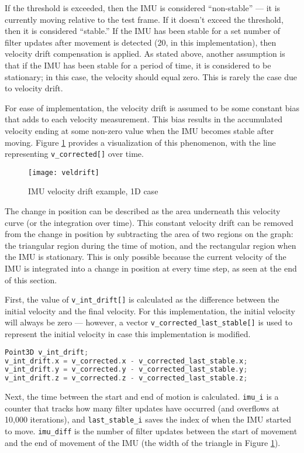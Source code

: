 \documentclass[11pt]{ucthesisCP}
\begin{document}
If the threshold is exceeded, then the IMU is considered “non-stable” --- it is currently moving relative to the test frame. If it doesn’t exceed the threshold, then it is considered “stable.” If the IMU has been stable for a set number of filter updates after movement is detected (20, in this implementation), then velocity drift compensation is applied. As stated above, another assumption is that if the IMU has been stable for a period of time, it is considered to be stationary; in this case, the velocity should equal zero. This is rarely the case due to velocity drift.

For ease of implementation, the velocity drift is assumed to be some constant bias that adds to each velocity measurement. This bias results in the accumulated velocity ending at some non-zero value when the IMU becomes stable after moving. Figure \ref{fig:veldrift} provides a visualization of this phenomenon, with the line representing \verb|v_corrected[]| over time.

\begin{figure}[htbp]
\centering
\texttt{[image: veldrift]}
\caption{IMU velocity drift example, 1D case}
\label{fig:veldrift}
\end{figure}

The change in position can be described as the area underneath this velocity curve (or the integration over time). This constant velocity drift can be removed from the change in position by subtracting the area of two regions on the graph: the triangular region during the time of motion, and the rectangular region when the IMU is stationary. This is only possible because the current velocity of the IMU is integrated into a change in position at every time step, as seen at the end of this section.

First, the value of \verb|v_int_drift[]| is calculated as the difference between the initial velocity and the final velocity. For this implementation, the initial velocity will always be zero --- however, a vector \verb|v_corrected_last_stable[]| is used to represent the initial velocity in case this implementation is modified.

\begin{lstlisting}[language=C++]
Point3D v_int_drift;
v_int_drift.x = v_corrected.x - v_corrected_last_stable.x;
v_int_drift.y = v_corrected.y - v_corrected_last_stable.y;
v_int_drift.z = v_corrected.z - v_corrected_last_stable.z;
\end{lstlisting}

Next, the time between the start and end of motion is calculated. \verb|imu_i| is a counter that tracks how many filter updates have occurred (and overflows at 10,000 iterations), and \verb|last_stable_i| saves the index of when the IMU started to move. \verb|imu_diff| is the number of filter updates between the start of movement and the end of movement of the IMU (the width of the triangle in Figure \ref{fig:veldrift}).
\end{document}
